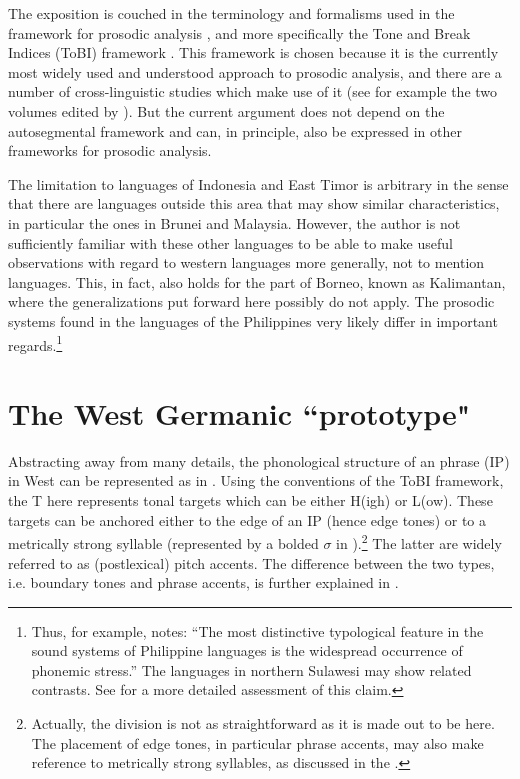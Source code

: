 \documentclass[output=paper
,modfonts
,nonflat]{langsci/langscibook}
\begin{document}
The exposition is couched in the terminology and formalisms used in the  framework for prosodic analysis \citep{Ladd2008}, and more specifically the Tone and Break Indices (ToBI) framework \citep{Beckman2005}. This framework is chosen because it is the currently most widely used and understood approach to prosodic analysis, and there are a number of cross-linguistic studies which make use of it (see for example the two volumes edited by \citealt{Jun2005, Jun2014}). But the current argument does not depend on the autosegmental framework and can, in principle, also be expressed in other frameworks for prosodic analysis.

 
The limitation to  languages of Indonesia and East Timor is arbitrary in the sense that there are  languages outside this area that may show similar characteristics, in particular the ones in Brunei and Malaysia. However, the author is not sufficiently familiar with these other languages to be able to make useful observations with regard to western  languages more generally, not to mention  languages. This, in fact, also holds for the  part of Borneo, known as Kalimantan, where the generalizations put forward here possibly do not apply. The prosodic systems found in the languages of the Philippines very likely differ in important regards.\footnote{Thus, for example, \citet[175]{Blust2013} notes: “The most distinctive typological feature in the sound systems of Philippine languages is the widespread occurrence of phonemic stress.” The  languages in northern Sulawesi may show related contrasts. See \citet{Himmelmann2018a} for a more detailed assessment of this claim.}

\section{\label{s:himmelmann:2}The West Germanic “prototype"}

Abstracting away from many details, the phonological structure of an  phrase (IP) in West  can be represented as in . Using the conventions of the ToBI framework, the T here represents tonal targets which can be either H(igh) or L(ow). These targets can be anchored either to the edge of an IP (hence edge tones) or to a metrically strong syllable (represented by a bolded $\sigma$ in ).\footnote{Actually, the division is not as straightforward as it is made out to be here. The placement of edge tones, in particular phrase accents, may also make reference to metrically strong syllables, as discussed in the \citet{Grice2000}.} The latter are widely referred to as (postlexical) pitch accents. The difference between the two  types, i.e. boundary tones and phrase accents, is further explained in .
\end{document}
